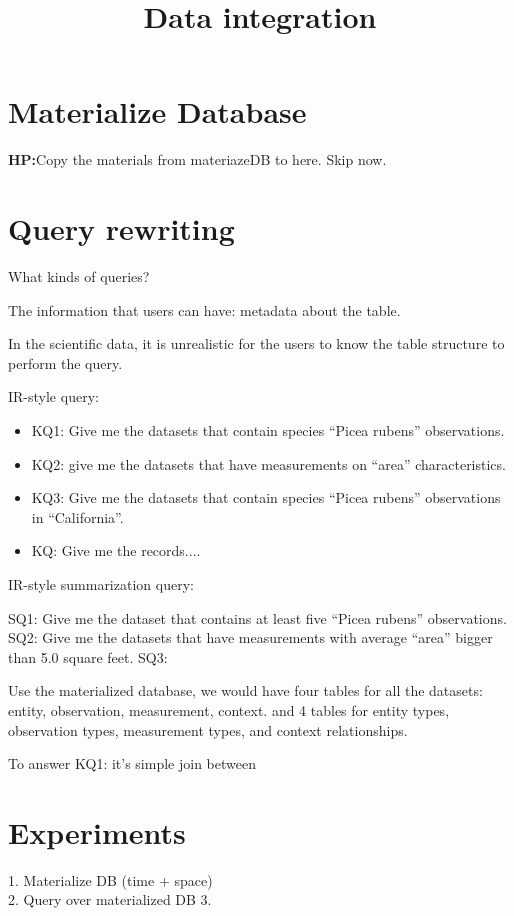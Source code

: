 \documentclass[10pt]{article}
\title{Data integration}
\author{}
\begin{document}
\maketitle

\section{Materialize Database}

{\bf HP:}{Copy the materials from materiazeDB to here. Skip now.}

\section{Query rewriting}

What kinds of queries? 

The information that users can have: metadata about the table. 

In the scientific data, it is unrealistic for the users to know the
table structure to perform the query. 

IR-style query: 
\begin{itemize}
\item KQ1: Give me the datasets that contain species ``Picea rubens'' observations.
\item KQ2: give me the datasets that have measurements on ``area''
  characteristics. 
\item KQ3: Give me the datasets that contain species ``Picea rubens''
  observations in ``California''. 
\item KQ: Give me the records....
\end{itemize}

IR-style summarization query: 
\begin{itemize}
SQ1: Give me the dataset that contains at least five ``Picea rubens'' observations.
SQ2: Give me the datasets that have measurements with average ``area''
bigger than 5.0 square feet. 
SQ3: 
\end{itemize}

Use the materialized database, we would have four tables for all the datasets: 
entity, observation, measurement, context. 
and 4 tables for entity types, observation types, measurement types,
and context relationships.

To answer KQ1: it's simple join between 

\section{Experiments}

1. Materialize DB (time + space) \\
2. Query over materialized DB 
3. 
\end{document}
